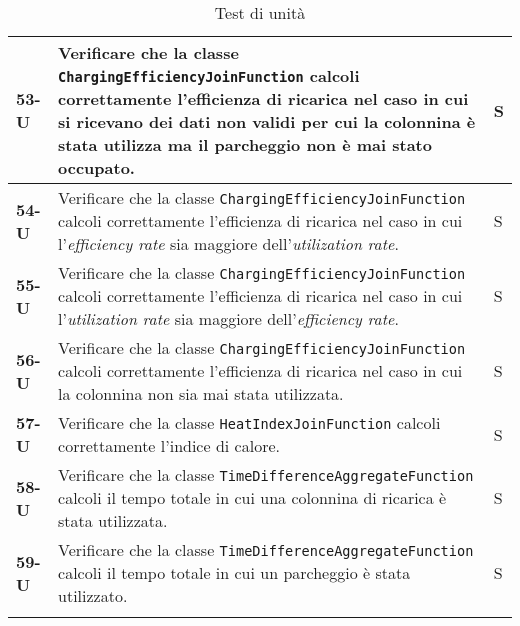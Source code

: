 \begin{longtable}{|>{\raggedright\arraybackslash}m{}|>{\raggedright\arraybackslash}m{}|>{\raggedright\arraybackslash}m{}|}
	\hline
	\textbf{53-U}   & Verificare che la classe \texttt{ChargingEfficiencyJoinFunction} calcoli correttamente l'efficienza di ricarica nel caso in cui si ricevano dei dati non validi per cui la colonnina è stata utilizza ma il parcheggio non è mai stato occupato. & S              \\
	\hline
	\textbf{54-U}   & Verificare che la classe \texttt{ChargingEfficiencyJoinFunction} calcoli correttamente l'efficienza di ricarica nel caso in cui l'\textit{efficiency rate} sia maggiore dell'\textit{utilization rate}.                                          & S              \\
	\hline
	\textbf{55-U}   & Verificare che la classe \texttt{ChargingEfficiencyJoinFunction} calcoli correttamente l'efficienza di ricarica nel caso in cui l'\textit{utilization rate} sia maggiore dell'\textit{efficiency rate}.                                          & S              \\
	\hline
	\textbf{56-U}   & Verificare che la classe \texttt{ChargingEfficiencyJoinFunction} calcoli correttamente l'efficienza di ricarica nel caso in cui la colonnina non sia mai stata utilizzata.                                                                       & S              \\
	\hline
	\textbf{57-U}   & Verificare che la classe \texttt{HeatIndexJoinFunction} calcoli correttamente l'indice di calore.                                                                                                                                                & S              \\
	\hline
	\textbf{58-U}   & Verificare che la classe \texttt{TimeDifferenceAggregateFunction} calcoli il tempo totale in cui una colonnina di ricarica è stata utilizzata.                                                                                                   & S              \\
	\hline
	\textbf{59-U}   & Verificare che la classe \texttt{TimeDifferenceAggregateFunction} calcoli il tempo totale in cui un parcheggio è stata utilizzato.                                                                                                               & S              \\
	\caption{Test di unità}
\end{longtable}

